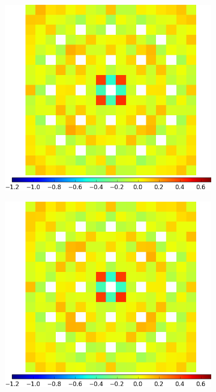 \begin{figure}[h!]
\begin{subfigure}{0.45\textwidth}
  \caption{}
  \label{fig:chap11-assm-1.6-capt-pinch-2}
\end{subfigure}
\begin{subfigure}{0.45\textwidth}
  \centering
  \includegraphics[width=\linewidth]{figures/results/assm-16/no-transform/capt-err-pinch-agglomerative-(6)}
  \caption{}
  \label{fig:chap11-assm-1.6-capt-pinch-6}
\end{subfigure}%
\begin{subfigure}{0.45\textwidth}
  \centering
  \includegraphics[width=\linewidth]{figures/results/assm-16/no-transform/capt-err-pinch-agglomerative-(10)}

\end{subfigure}
\end{figure}
